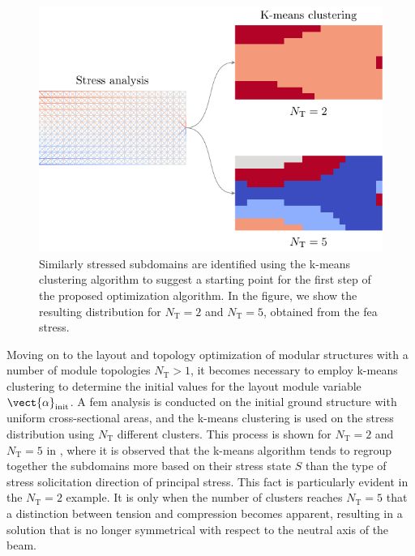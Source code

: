 \begin{figure}
    \centering
    \includegraphics{figures/06_DMO/00_optimized_modules/kmeans.pdf}
    \caption{Similarly stressed subdomains are identified using the k-means clustering algorithm to suggest a starting point for the first step of the proposed optimization algorithm. In the figure, we show the resulting distribution for $N_\text{T}=2$ and $N_\text{T}=5$, obtained from the \gls{fea} stress.}
    \label{fig:06_cant_kmeans}
\end{figure}

Moving on to the layout and topology optimization of modular structures with a number of module topologies $N_\text{T} > 1$, it becomes necessary to employ k-means clustering to determine the initial values for the layout module variable  $\vect{\alpha}_\text{init}$. A \gls{fem} analysis is conducted on the initial ground structure with uniform cross-sectional areas, and the k-means clustering is used on the stress distribution using $N_\text{T}$ different clusters. This process is shown for $N_\text{T}=2$ and $N_\text{T}=5$ in , where it is observed that the k-means algorithm tends to regroup together the subdomains more based on their stress state $S$ than the type of stress solicitation \ie direction of principal stress. This fact is particularly evident in the $N_\text{T}=2$ example. It is only when the number of clusters reaches $N_\text{T}=5$ that a distinction between tension and compression becomes apparent, resulting in a solution that is no longer symmetrical with respect to the neutral axis of the beam.

